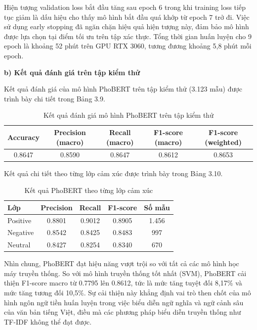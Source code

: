 \documentclass[14pt, a4paper]{report}
\begin{document}
Hiện tượng validation loss bắt đầu tăng sau epoch 6 trong khi training loss tiếp tục giảm là dấu hiệu cho thấy mô hình bắt đầu quá khớp từ epoch 7 trở đi. Việc sử dụng early stopping đã ngăn chặn hiệu quả hiện tượng này, đảm bảo mô hình được lựa chọn tại điểm tối ưu trên tập xác thực. Tổng thời gian huấn luyện cho 9 epoch là khoảng 52 phút trên GPU RTX 3060, tương đương khoảng 5,8 phút mỗi epoch.


\textbf{b) Kết quả đánh giá trên tập kiểm thử}


Kết quả đánh giá của mô hình PhoBERT trên tập kiểm thử (3.123 mẫu) được trình bày chi tiết trong Bảng 3.9.



\begin{table}[h]
\centering
\caption{Kết quả đánh giá mô hình PhoBERT trên tập kiểm thử}
\begin{tabular}{|c|c|c|c|c|}
\hline
\textbf{Accuracy} & \textbf{Precision (macro)} & \textbf{Recall (macro)} & \textbf{F1-score (macro)} & \textbf{F1-score (weighted)} \\
\hline
0.8647 & 0.8590 & 0.8647 & 0.8612 & 0.8653 \\
\hline
\end{tabular}
\end{table}


Kết quả chi tiết theo từng lớp cảm xúc được trình bày trong Bảng 3.10.


\begin{table}[h]
\centering
\caption{Kết quả PhoBERT theo từng lớp cảm xúc}
\begin{tabular}{|l|c|c|c|c|}
\hline
\textbf{Lớp} & \textbf{Precision} & \textbf{Recall} & \textbf{F1-score} & \textbf{Số mẫu} \\
\hline
Positive & 0.8801 & 0.9012 & 0.8905 & 1.456 \\
\hline
Negative & 0.8542 & 0.8425 & 0.8483 & 997 \\
\hline
Neutral & 0.8427 & 0.8254 & 0.8340 & 670 \\
\hline
\end{tabular}
\end{table}




Nhìn chung, PhoBERT đạt hiệu năng vượt trội so với tất cả các mô hình học máy truyền thống. So với mô hình truyền thống tốt nhất (SVM), PhoBERT cải thiện F1-score macro từ 0.7795 lên 0.8612, tức là mức tăng tuyệt đối 8,17\% và mức tăng tương đối 10,5\%. Sự cải thiện này khẳng định vai trò then chốt của mô hình ngôn ngữ tiền huấn luyện trong việc biểu diễn ngữ nghĩa và ngữ cảnh sâu của văn bản tiếng Việt, điều mà các phương pháp biểu diễn truyền thống như TF-IDF không thể đạt được.
\end{document}

